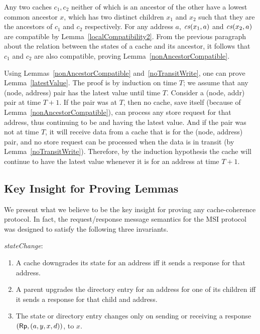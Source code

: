 Any two caches $c_1, c_2$ neither of which is an ancestor of the other have a
lowest common ancestor $x$, which has
two distinct children $x_1$ and $x_2$ such that they are the ancestors of $c_1$
and $c_2$ respectively. For any address $a$, $\mathit{cs}(x_1, a)$ and
$\mathit{cs}(x_2, a)$ are compatible by Lemma~\ref{localCompatibility2}. From
the previous paragraph about the relation between the states of a cache and its
ancestor, it follows that $c_1$ and $c_2$ are also compatible, proving
Lemma~\ref{nonAncestorCompatible}.

Using Lemmas~\ref{nonAncestorCompatible} and~\ref{noTransitWrite}, one can
prove Lemma~\ref{latestValue}. The proof is by induction on time $T$; we assume
that any \clean{} (node, address) pair has the latest value until time
$T$. Consider a (node, addr) pair at time $T+1$.
If the pair was \clean{} at $T$, then no cache,
save itself (because of Lemma~\ref{nonAncestorCompatible}), can process any
store request for that address, thus continuing to be \clean{} and having the latest value.
And if the pair was not \clean{} at time $T$, it will receive data from a cache
that is \clean{} for the (node, address) pair, and no store
request can be processed when the data is in transit (by
Lemma~\ref{noTransitWrite}). Therefore, by the induction hypothesis the cache will
continue to have the latest value whenever it is \clean{} for an address at time $T+1$.

\subsection{Key Insight for Proving Lemmas}

We present what we believe to be the key insight for proving any
cache-coherence protocol.  In fact, the request/response message semantics for
the MSI protocol was designed to satisfy the following three invariants.

\begin{inv}
\textit{stateChange}:
\begin{enumerate}
\item A cache downgrades its state for an address iff it sends a response for that address.
\item A parent upgrades the directory entry for an address for one of its
children iff it sends a response for that child and address.
\item The state or directory entry changes only on sending or
receiving a response $(\mathsf{Rp}, (a, y, x, d))$, to $x$.
\end{enumerate}
\label{stateChange}
\end{inv}

